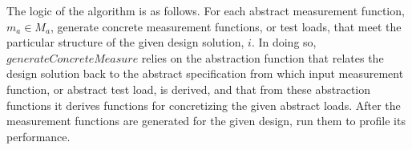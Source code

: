 \documentclass{sig-alternate}
\begin{document}
The logic of the algorithm is as follows. For each abstract measurement function, $m_a \in M_a$, generate concrete measurement functions, or test loads, that meet the particular structure of the given design solution, $i$. In doing so, $generateConcreteMeasure$ relies on the abstraction function that relates the design solution back to the abstract specification from which input measurement function, or abstract test load, is derived, and that from these abstraction functions it derives functions for concretizing  the given abstract loads. After the measurement functions are generated for the given design, run them to profile its performance.



\end{document}
